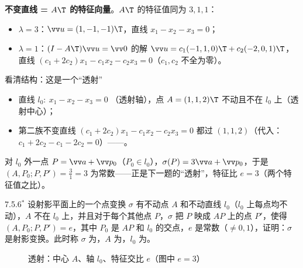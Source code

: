 \textbf{不变直线 = $A\T$ 的特征向量}。$A\T$ 的特征值同为 $3,1,1$：
\begin{itemize}
\item $\lambda=3$：$\vv u=(1,-1,-1)\T$，直线 $x_1-x_2-x_3=0$；
\item $\lambda=1$：$(I-A\T)\vv u=\vv 0$ 的解 $\vv u=c_1(-1,1,0)\T+c_2(-2,0,1)\T$，直线 $(c_1+2c_2)x_1-c_1x_2-c_2x_3=0$（$c_1,c_2$ 不全为零）。
\end{itemize}

\begin{intbox}{看清结构：这是一个“透射”}
\begin{itemize}
\item 直线 $l_0:\ x_1-x_2-x_3=0$ （透射轴），点 $A=(1,1,2)\T$ 不动且不在 $l_0$ 上（透射中心）；
\item 第二族不变直线 $(c_1+2c_2)x_1-c_1x_2-c_2x_3=0$ 都过 $(1,1,2)$（代入：$c_1+2c_2-c_1-2c_2=0$）——。
\end{itemize}
对 $l_0$ 外一点 $P=\vv a+\vv p_0$（$P_0\in l_0$），$\sigma(P)=3\vv a+\vv p_0$，于是 $(A,P_0;P,P')=\frac{3}{1}=3$ 为常数——正是下一题的“透射”，特征比 $e=3$（两个特征值之比）。
\end{intbox}

\begin{ex}{7.5.6$^*$}
设射影平面上的一个点变换 $\sigma$ 有不动点 $A$ 和不动直线 $l_0$（$l_0$ 上每点均不动），$A$ 不在 $l_0$ 上，并且对于每个其他点 $P$，$\sigma$ 把 $P$ 映成 $AP$ 上的点 $P'$，使得 $(A,P_0;P,P')=e$，其中 $P_0$ 是 $AP$ 和 $l_0$ 的交点，$e$ 是常数（$\neq0,1$），证明：$\sigma$ 是射影变换。此时称 $\sigma$ 为，$A$ 为，$l_0$ 为。
\end{ex}

\begin{figure}[htbp]
\centering
{}
\caption{透射：中心 $A$、轴 $l_0$、特征交比 $e$（图中 $e=3$）}
\end{figure}

